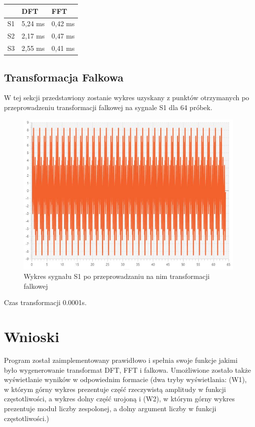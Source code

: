 \documentclass[12pt]{article}
\begin{document}
\begin{table}[H]
\centering
\begin{tabular}{|l|l|l|}
\hline
   & DFT     & FFT     \\ \hline
S1 & 5,24 ms & 0,42 ms \\ \hline
S2 & 2,17 ms & 0,47 ms \\ \hline
S3 & 2,55 ms & 0,41 ms \\ \hline
\end{tabular}
\end{table}

\subsection{Transformacja Falkowa}
W tej sekcji przedstawiony zostanie wykres uzyskany z punktów otrzymanych po przeprowadzeniu transformacji falkowej na sygnale S1 dla 64 próbek.
\begin{figure}[H]
	\centering
	\includegraphics[width=\linewidth]{falkowa-s1}
	\caption{Wykres sygnału S1 po przeprowadzaniu na nim transformacji falkowej}
	\label{s1-falkowa}
\end{figure}
Czas transformacji 0.0001s.


\section{Wnioski}
\indent
\indent Program został zaimplementowany prawidłowo i spełnia swoje funkcje jakimi było wygenerowanie transformat DFT, FFT i falkowa. Umożliwione zostało także wyświetlanie wyników w odpowiednim formacie (dwa tryby wyświetlania: (W1), w którym górny wykres prezentuje część rzeczywistą amplitudy w funkcji częstotliwości, a wykres dolny część urojoną i (W2), w którym górny wykres prezentuje moduł liczby zespolonej, a dolny argument liczby w funkcji częstotliwości.)\\
\end{document}
